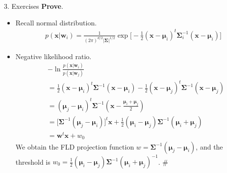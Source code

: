 \documentclass[compress,blue]{beamer}
\newcommand{\bx}{\mathbf{x}}
\begin{document}
\begin{frame}{3. Exercises}
	\textbf{Prove}. 
	\begin{itemize}
		\item Recall normal distribution. 
		\begin{align}
			p(\mathbf{x}|\mathbf{w}_i) = \frac{1}{(2\pi)^{d/2}|\mathbf{\Sigma}|^{1/2}} \exp\Big[-\frac{1}{2}(\mathbf{x}-\mathbf{\mu}_i)^t\mathbf{\Sigma}_i^{-1}(\mathbf{x}-\mathbf{\mu}_i)\Big] \nonumber
		\end{align}
		\item Negative likelihood ratio.
		\scriptsize
		\begin{align}
			&-\ln \frac{p(\mathbf{x}|\mathbf{w}_i)}{p(\mathbf{x}|\mathbf{w}_j)} \nonumber\\
			&= \frac{1}{2}(\mathbf{x}-\mathbf{\mu}_i)^t\mathbf{\Sigma}^{-1}(\mathbf{x}-\mathbf{\mu}_i) - \frac{1}{2}(\mathbf{x}-\mathbf{\mu}_j)^t\mathbf{\Sigma}^{-1}(\mathbf{x}-\mathbf{\mu}_j)  \nonumber\\
			&= (\mathbf{\mu}_j - \mathbf{\mu}_i)^t\mathbf{\Sigma}^{-1}(\bx - \frac{\mathbf{\mu}_i+\mathbf{\mu}_j}{2})\\
			&= \big[\mathbf{\Sigma}^{-1}(\mathbf{\mu}_j - \mathbf{\mu}_i)\big]^t \bx + \frac{1}{2}(\mathbf{\mu}_i - \mathbf{\mu}_j)\mathbf{\Sigma}^{-1}(\mathbf{\mu}_i + \mathbf{\mu}_j)\\
			&=\mathbf{w}^t\bx + w_0 
		\end{align}
		We obtain the FLD projection function $w = \mathbf{\Sigma}^{-1}(\mathbf{\mu}_j - \mathbf{\mu}_i)$, and the threshold is $w_0 = \frac{1}{2}(\mathbf{\mu}_i - \mathbf{\mu}_j)\mathbf{\Sigma}^{-1}(\mathbf{\mu}_i + \mathbf{\mu}_j)^{-1}$. \#
		\normalsize
	\end{itemize}
\end{frame}
\end{document}
